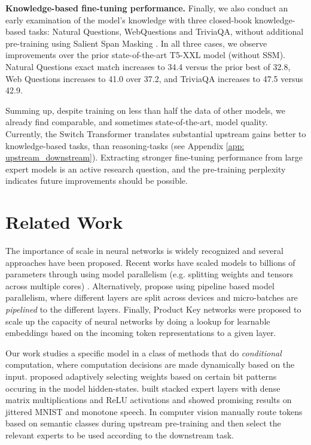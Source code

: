 \documentclass[twoside,11pt]{article}
\begin{document}
\textbf{Knowledge-based fine-tuning performance.} Finally, we also conduct an early examination of the model's knowledge with three closed-book knowledge-based tasks: Natural Questions, WebQuestions and TriviaQA, without additional pre-training using Salient Span Masking \citep{guu2020realm}.
In all three cases, we observe improvements over the prior state-of-the-art T5-XXL model (without SSM).
Natural Questions exact match increases to 34.4 versus the prior best of 32.8, Web Questions increases to 41.0 over 37.2, and TriviaQA increases to 47.5 versus 42.9. 

Summing up, despite training on less than half the data of other models, we already find comparable, and sometimes state-of-the-art, model quality.
Currently, the Switch Transformer translates substantial upstream gains better to knowledge-based tasks, than reasoning-tasks (see Appendix 
\ref{app: upstream_downstream}).
Extracting stronger fine-tuning performance from large expert models is an active research question, and the pre-training perplexity indicates future improvements should be possible.

\section{Related Work}
The importance of scale in neural networks is widely recognized and several approaches have been proposed.
Recent works have scaled models to billions of parameters through using model parallelism (e.g. splitting weights and tensors across multiple cores) \citep{shazeer2018mesh,rajbhandari2019zero,raffel2019exploring,brown2020language,shoeybi2019megatron}.
Alternatively, \cite{harlap2018pipedream,huang2019gpipe} propose using pipeline based model parallelism, where different layers are split across devices and micro-batches are \emph{pipelined} to the different layers.
Finally, Product Key networks \citep{lample2019large} were proposed to scale up the capacity of neural networks by doing a lookup for learnable embeddings based on the incoming token representations to a given layer.

Our work studies a specific model in a class of methods that do \emph{conditional} computation, where computation decisions are made dynamically based on the input. 
\cite{cho2014exponentially} proposed adaptively selecting weights based on certain bit patterns occuring in the model hidden-states. 
\cite{eigen2013learning} built stacked expert layers with dense matrix multiplications and ReLU activations and showed promising results on jittered MNIST and monotone speech.
In computer vision \cite{puigcerver2020scalable} manually route tokens based on semantic classes during upstream pre-training and then select the relevant experts to be used according to the downstream task.
\end{document}
